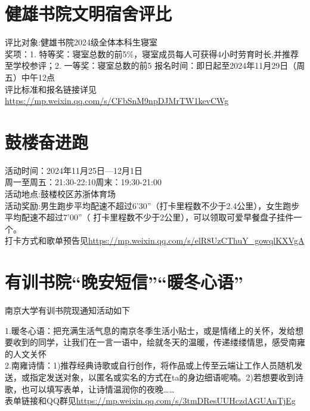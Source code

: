 \documentclass[letterpaper, 12pt]{article}
\begin{document}
\begin{multicols}{2}
\section{健雄书院文明宿舍评比}
评比对象:健雄书院2024级全体本科生寝室\\
奖项：1. 特等奖：寝室总数的前5\%，寝室成员每人可获得4小时劳育时长,并推荐至学校参评；2. 一等奖：寝室总数的前5%
报名时间：即日起至2024年11月29日（周五）中午12点\\
评比标准和报名链接详见\url{https://mp.weixin.qq.com/s/CFbSnM9npDJMrTW1kevCWg}

\section{鼓楼奋进跑}
活动时间：2024年11月25日—12月1日\\
周一至周五：21:30-22:10周末：19:30-21:00\\
活动地点:鼓楼校区苏浙体育场\\
活动奖励:男生跑步平均配速不超过6'30''（打卡里程数不少于2.4公里），女生跑步平均配速不超过7'00''（ 打卡里程数不少于2公里），可以领取可爱早餐盘子挂件一个。\\
打卡方式和歌单预告见\url{https://mp.weixin.qq.com/s/elR8UzCThuY_gowqlKXVgA}

\section{有训书院“晚安短信”“暖冬心语”}
南京大学有训书院现通知活动如下

1.暖冬心语：把充满生活气息的南京冬季生活小贴士，或是情绪上的关怀，发给想要收到的同学，让我们在一言一语中，绘就冬天的温暖，传递缕缕情思，感受南雍的人文关怀\\
2.南雍诗情：1)推荐经典诗歌或自行创作，将作品或上传至云端让工作人员随机发送，或指定发送对象，以匿名或实名的方式在ta的身边细语呢喃。2)若想要收到诗歌，也可以填写表单，让诗情温润你的夜晚……\\
表单链接和QQ群见\url{https://mp.weixin.qq.com/s/3tmDResUUHczdAGUAnTjEg}


\end{multicols}
\end{document}
